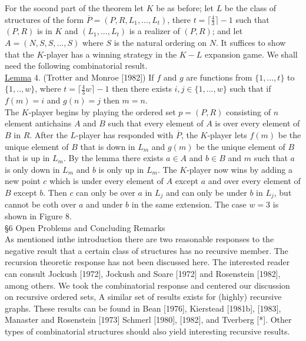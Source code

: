 \documentclass[twoside]{article}
\begin{document}
For the socond part of the theorem let $K$ be as before; let $L$ be the class of structures
of the form $\overline{P}=(P,R,L_1,...,L_t)$, there $t=\lceil \frac 4 3\rceil - 1$ such that
$(P,R)$ is in $K$ and $(L_1,...,L_t)$ is a realizer of $(P,R)$; and let $A=(N,S,S,...,S)$
where $S$ is the natural ordering on $N$. It suffices to show that the $K$-player has a winning
strategy in the $K-L$ expansion game. We shall need the following combinatorial result.\\
\newline
\underline{Lemma} 4. (Trotter and Monroe [1982]) If $f$ and $g$ are functions from $\{1,...,t\}$
to $\{1,..,w\}$, where $t = \lceil {\frac 4 3}w \rceil - 1$ then there exists $i,j \in \{1,...,w\}$
such that if $f(m) = i$ and $g(n) = j$ then $m=n$.\\

The $K$-player begins by playing the ordered set $p=(P,R)$ consisting of $n$ element antichains
$A$ and $B$ such that every element of $A$ is over every element of $B$ in $R$. After the $L$-player
has responded with $\overline{P}$, the $K$-player lets $f(m)$ be the unique element of $B$
that is down in $L_m$ and $g(m)$ be the unique element of $B$ that is up in $L_m$. By the lemma there exists
$a \in A$ and $b \in B$ and $m$ such that $a$ is only down in $L_m$ and $b$ is only up in $L_m$.
The $K$-player now wins by adding a new point $c$ which is under every element of $A$ except
$a$ and over every element of $B$ except $b$. Then $c$ can only be over $a$ in $L_j$ and can only be under
$b$ in $L_j$, but cannot be coth over $a$ and under $b$ in the same extension. The case
$w=3$ is shown in Figure 8.\\
%
%


\noindent\S 6 Open Problems and Concluding Remarks\\


As mentioned inthe introduction there are two reasonable responses to the negative result that
a certain class of structures has no recursive member. The recursion theoretic response has not
been discussed here. The interested reader can consult Jockush [1972], Jockush and Soare [1972]
and Rosenstein [1982], among others. We took the combinatorial response and centered our discussion on recursive
ordered sets, A similar set of results exists for (highly) recursive graphs. These results can be found in Bean [1976],
Kierstead [1981b], [1983], Manaster and Rosenstein [1973] Schmerl [1980], [1982], and Tverberg [*].
Other types of combinatorial structures should also yield interesting recursive results.\\
\end{document}
